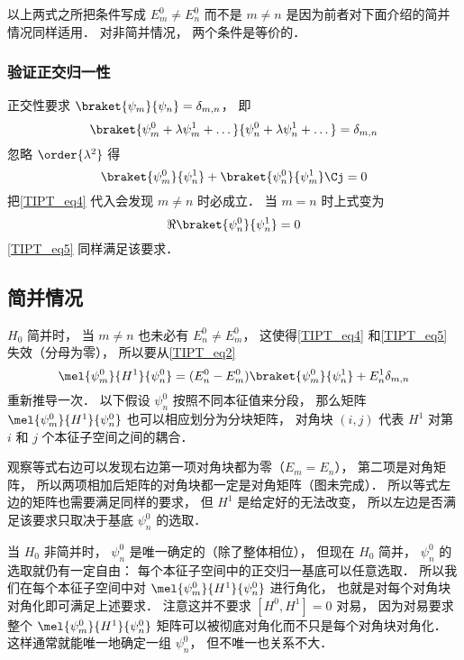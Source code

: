 以上两式之所把条件写成 $E_m^0 \ne E_n^0$ 而不是 $m \ne n$ 是因为前者对下面介绍的简并情况同样适用． 对非简并情况， 两个条件是等价的．

\subsubsection{验证正交归一性}
正交性要求 $\braket{\psi_m}{\psi_n} = \delta_{m,n}$， 即
\begin{equation}\label{TIPT_eq7}
\braket{\psi_m^0 + \lambda \psi_m^1 + \dots}{\psi_n^0 + \lambda \psi_n^1 + \dots} = \delta_{m,n}
\end{equation}
忽略 $\order{\lambda^2}$ 得
\begin{equation}\label{TIPT_eq8}
\braket{\psi_m^0}{\psi_n^1} + \braket{\psi_n^0}{\psi_m^1}\Cj = 0
\end{equation}
把\autoref{TIPT_eq4} 代入会发现 $m \ne n$ 时必成立． 当 $m = n$ 时上式变为
\begin{equation}
\Re{\braket{\psi_n^0}{\psi_n^1}} = 0
\end{equation}
\autoref{TIPT_eq5} 同样满足该要求．

\subsection{简并情况}
$H_0$ 简并时， 当 $m\ne n$ 也未必有 $E_n^0 \ne E_m^0$， 这使得\autoref{TIPT_eq4} 和\autoref{TIPT_eq5} 失效（分母为零）， 所以要从\autoref{TIPT_eq2}
\begin{equation}\label{TIPT_eq10}
\mel{\psi_m^0}{H^1}{\psi_n^0} = (E_n^0 - E_m^0) \braket{\psi_m^0}{\psi_n^1} + E_n^1 \delta_{m,n}
\end{equation}
重新推导一次． 以下假设 $\psi_n^0$ 按照不同本征值来分段， 那么矩阵 $\mel{\psi_m^0}{H^1}{\psi_n^0}$ 也可以相应划分为分块矩阵， 对角块 $(i,j)$ 代表 $H^1$ 对第 $i$ 和 $j$ 个本征子空间之间的耦合．

观察等式右边可以发现右边第一项对角块都为零（$E_m = E_n$）， 第二项是对角矩阵， 所以两项相加后矩阵的对角块都一定是对角矩阵（图未完成）． 所以等式左边的矩阵也需要满足同样的要求， 但 $H^1$ 是给定好的无法改变， 所以左边是否满足该要求只取决于基底 $\psi_n^0$ 的选取．

当 $H_0$ 非简并时， $\psi_n^0$ 是唯一确定的（除了整体相位）， 但现在 $H_0$ 简并， $\psi_n^0$ 的选取就仍有一定自由： 每个本征子空间中的正交归一基底可以任意选取． 所以我们在每个本征子空间中对 $\mel{\psi_m^0}{H^1}{\psi_n^0}$ 进行角化， 也就是对每个对角块对角化即可满足上述要求． 注意这并不要求 $[H^0, H^1] = 0$ 对易， 因为对易要求整个 $\mel{\psi_m^0}{H^1}{\psi_n^0}$ 矩阵可以被彻底对角化而不只是每个对角块对角化． 这样通常就能唯一地确定一组 $\psi_n^0$， 但不唯一也关系不大．

